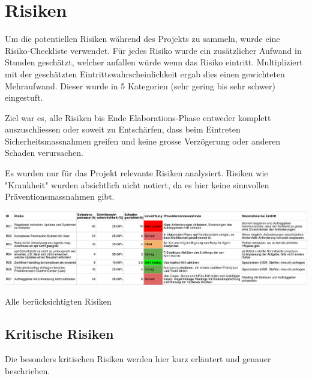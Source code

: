 \section{Risiken}\label{sec:risiken}

Um die potentiellen Risiken während des Projekts zu sammeln, wurde eine  Risiko-Checkliste verwendet. Für jedes Risiko wurde ein zusätzlicher Aufwand in Stunden geschätzt, welcher anfallen würde wenn das Risiko eintritt. Multipliziert mit der geschätzten Eintrittswahrscheinlichkeit ergab dies einen gewichteten Mehraufwand. Dieser wurde in 5 Kategorien (sehr gering bis sehr schwer) eingestuft.

Ziel war es, alle Risiken bis Ende Elaborations-Phase entweder komplett auszuschliessen oder soweit zu Entschärfen, dass beim Eintreten Sicherheitsmassnahmen greifen und keine grosse Verzögerung oder anderen Schaden verursachen.

Es wurden nur für das Projekt relevante Risiken analysiert. Risiken wie "Krankheit" wurden absichtlich nicht notiert, da es hier keine sinnvollen Präventionsmassnahmen gibt.

\begin{landscape}
	\begin{table}[H]
		\centering
		\includegraphics[width=1.3\textwidth,keepaspectratio]{Risikoanalyse.pdf}
		\caption{Alle berücksichtigten Risiken}
		\label{tab:risikoanalyse}
	\end{table}
\end{landscape}

\subsection*{Kritische Risiken}

Die besonders kritischen Risiken werden hier kurz erläutert und genauer beschrieben.

\newcommand{\projectrisk}[4]{
	\begin{tabularx}{\linewidth}{lX}
		\toprule
		\textbf{Risiko} & #1\\
		\midrule
		\textbf{Titel} & #2\\
		\textbf{Beschreibung} & #3\\
		\textbf{Prävention/Massnahme} & #4\\
		\bottomrule
	\end{tabularx}
}


